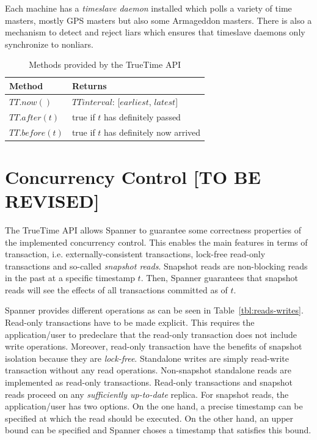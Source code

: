 \documentclass[onecolumn, a4paper, 10pt]{article}
\newcommand{\tbr}{{\color{red}\textbf{[TO BE REVISED]}}}
\begin{document}
Each machine has a \emph{timeslave daemon} installed which polls a variety of
time masters, mostly GPS masters but also some Armageddon masters. There is also
a mechanism to detect and reject liars which ensures that timeslave daemons only
synchronize to nonliars. 

\begin{table}[ht]
  \centering
  \begin{tabular}{|l||l|}
    \hline
    {\bfseries Method} & {\bfseries Returns} \tabularnewline
    \hline\hline
    $TT.now()$ & $TTinterval$: [$earliest$, $latest$] \tabularnewline
    \hline
    $TT.after(t)$ & true if $t$ has definitely passed \tabularnewline
    \hline
    $TT.before(t)$ & true if $t$ has definitely now arrived \tabularnewline
    \hline
  \end{tabular}
  \caption{Methods provided by the TrueTime API}
  \label{tbl:truetime-api}
\end{table}

\section{Concurrency Control \tbr}
\label{sec:concurrency-control}

The TrueTime API allows Spanner to guarantee some correctness properties of the
implemented concurrency control. This enables the main features in terms of
transaction, i.e. externally-consistent transactions, lock-free read-only
transactions and so-called \emph{snapshot reads}. Snapshot reads are non-blocking
reads in the past at a specific timestamp $t$. Then, Spanner guarantees that
snapshot reads will see the effects of all transactions committed as of $t$.

Spanner provides different operations as can be seen in
Table~\ref{tbl:reads-writes}. Read-only transactions have to be made explicit.
This requires the application/user to predeclare that the read-only transaction
does not include write operations. Moreover, read-only transaction have the
benefits of snapshot isolation because they are \emph{lock-free}. Standalone
writes are simply read-write transaction without any read operations. Non-snapshot
standalone reads are implemented as read-only transactions. Read-only transactions
and snapshot reads proceed on any \emph{sufficiently up-to-date} replica. For
snapshot reads, the application/user has two options. On the one hand, a precise
timestamp can be specified at which the read should be executed. On the other
hand, an upper bound can be specified and Spanner choses a timestamp that
satisfies this bound. 
\end{document}
